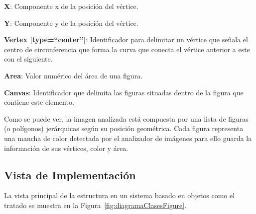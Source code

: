 \begin{longenum}
\begin{longenum}
\begin{longenum}
\begin{longenum}
\begin{longenum}
						\item \textbf{X}: Componente x de la posición del vértice.
						\item \textbf{Y}: Componente y de la posición del vértice.
						\end{longenum}
					\item \textbf{Vertex [type=``center'']}: Identificador para delimitar un vértice que señala el centro de circunferencia que forma la curva que conecta el vértice anterior a este con el siguiente.
				\end{longenum}
			\end{longenum}
		\end{longenum}
		\item \textbf{Area}: Valor numérico del área de una figura.
		\item \textbf{Canvas}: Identificador que delimita las figuras situadas dentro de la figura que contiene este elemento. 
	\end{longenum}
	
	Como se puede ver, la imagen analizada está compuesta por una lista de figuras (o polígonos) jerárquicas según su posición geométrica. Cada figura representa una mancha de color detectada por el analizador de imágenes para ello guarda la información de sus vértices, color y área.


\subsection{Vista de Implementación}

	La vista principal de la estructura en un sistema basado en objetos como el tratado se muestra en la Figura~\ref{fig:diagramaClasesFigure}.\\

